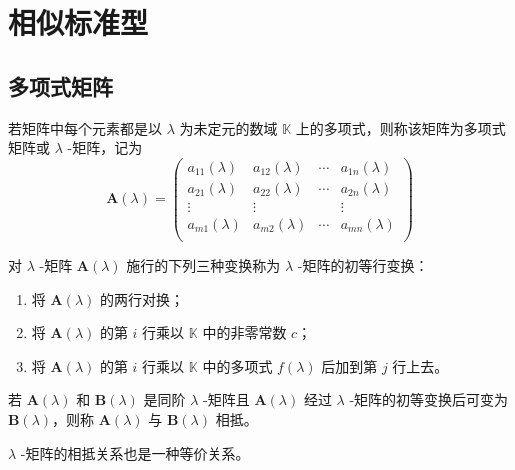 \chapter{相似标准型}


\section{多项式矩阵}

\begin{definition}
    若矩阵中每个元素都是以 $\lambda$ 为未定元的数域 $\mathbb{K}$ 上的多项式，则称该矩阵为多项式矩阵或 $\lambda$ -矩阵，记为
    \[
        \bm{A}(\lambda) = \begin{pmatrix}
            a_{11}(\lambda) & a_{12}(\lambda) & \cdots & a_{1n}(\lambda) \\
            a_{21}(\lambda) & a_{22}(\lambda) & \cdots & a_{2n}(\lambda) \\
            \vdots          & \vdots          & \      & \vdots          \\
            a_{m1}(\lambda) & a_{m2}(\lambda) & \cdots & a_{mn}(\lambda) \\
        \end{pmatrix}
    \]
\end{definition}

\begin{definition}
    对 $\lambda$ -矩阵 $\bm{A}(\lambda)$ 施行的下列三种变换称为 $\lambda$ -矩阵的初等行变换：
    \begin{enumerate}
        \item 将 $\bm{A}(\lambda)$ 的两行对换；
        \item 将 $\bm{A}(\lambda)$ 的第 $i$ 行乘以 $\mathbb{K}$ 中的非零常数 $c$；
        \item 将 $\bm{A}(\lambda)$ 的第 $i$ 行乘以 $\mathbb{K}$ 中的多项式 $f(\lambda)$ 后加到第 $j$ 行上去。
    \end{enumerate}
\end{definition}

\begin{definition}
    若 $\bm{A}(\lambda)$ 和 $\bm{B}(\lambda)$ 是同阶 $\lambda$ -矩阵且 $\bm{A}(\lambda)$ 经过 $\lambda$ -矩阵的初等变换后可变为 $\bm{B}(\lambda)$，则称 $\bm{A}(\lambda)$ 与 $\bm{B}(\lambda)$ 相抵。
\end{definition}

\begin{remark}
    $\lambda$ -矩阵的相抵关系也是一种等价关系。
\end{remark}

